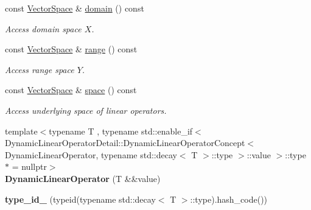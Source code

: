 \begin{DoxyCompactItemize}
\item 
\hypertarget{classSpacy_1_1DynamicLinearOperator_aa5882565e1a88f20a16f7e7a27df3015}{const \hyperlink{classSpacy_1_1VectorSpace}{\-Vector\-Space} \& \hyperlink{classSpacy_1_1DynamicLinearOperator_aa5882565e1a88f20a16f7e7a27df3015}{domain} () const }\label{classSpacy_1_1DynamicLinearOperator_aa5882565e1a88f20a16f7e7a27df3015}

\begin{DoxyCompactList}\small\item\em \-Access domain space $X$. \end{DoxyCompactList}\item 
\hypertarget{classSpacy_1_1DynamicLinearOperator_a08e5f8bd41f1112ae349e50dd773b9ea}{const \hyperlink{classSpacy_1_1VectorSpace}{\-Vector\-Space} \& \hyperlink{classSpacy_1_1DynamicLinearOperator_a08e5f8bd41f1112ae349e50dd773b9ea}{range} () const }\label{classSpacy_1_1DynamicLinearOperator_a08e5f8bd41f1112ae349e50dd773b9ea}

\begin{DoxyCompactList}\small\item\em \-Access range space $Y$. \end{DoxyCompactList}\item 
\hypertarget{classSpacy_1_1DynamicLinearOperator_afde64039ceab0ad8752bce3ac2187a41}{const \hyperlink{classSpacy_1_1VectorSpace}{\-Vector\-Space} \& \hyperlink{classSpacy_1_1DynamicLinearOperator_afde64039ceab0ad8752bce3ac2187a41}{space} () const }\label{classSpacy_1_1DynamicLinearOperator_afde64039ceab0ad8752bce3ac2187a41}

\begin{DoxyCompactList}\small\item\em \-Access underlying space of linear operators. \end{DoxyCompactList}\item 
\hypertarget{classSpacy_1_1DynamicLinearOperator_a3fb5b02bd4c03894dc502a936a9a3ec8}{{\footnotesize template$<$typename T , typename std\-::enable\-\_\-if$<$ Dynamic\-Linear\-Operator\-Detail\-::\-Dynamic\-Linear\-Operator\-Concept$<$ Dynamic\-Linear\-Operator, typename std\-::decay$<$ T $>$\-::type $>$\-::value $>$\-::type $\ast$  = nullptr$>$ }\\{\bfseries \-Dynamic\-Linear\-Operator} (\-T \&\&value)}\label{classSpacy_1_1DynamicLinearOperator_a3fb5b02bd4c03894dc502a936a9a3ec8}

\item 
\hypertarget{classSpacy_1_1DynamicLinearOperator_aa27dc55a85667ce43739d7141d9553f6}{{\bfseries type\-\_\-id\-\_\-} (typeid(typename std\-::decay$<$ \-T $>$\-::type).hash\-\_\-code())}\label{classSpacy_1_1DynamicLinearOperator_aa27dc55a85667ce43739d7141d9553f6}


\end{DoxyCompactItemize}
